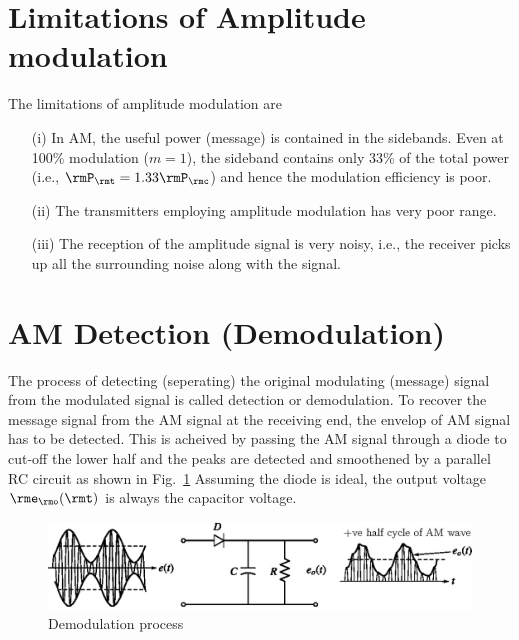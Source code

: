\section{Limitations of Amplitude modulation}\label{sec8.6}
The limitations of amplitude modulation are 
\begin{itemize}
\item[(i)] In AM, the  useful power (message) is contained in the
sidebands. Even at 100\% modulation ($m=1$), the sideband contains
only 33\%  of the total power (i.e., $\rmP_\rmt =1.33 \rmP_\rmc$) and
hence the modulation efficiency is poor.

\item[(ii)] The transmitters employing amplitude modulation has very
poor range.

\item[(iii)] The reception of the amplitude signal is very noisy,
i.e., the receiver picks up all the surrounding noise along with the signal.
\end{itemize}

\section{AM Detection (Demodulation)}\label{sec8.7}
The process of detecting (seperating) the original modulating
(message) signal from the modulated signal is called detection or
demodulation. To recover the message signal from the AM signal at the
receiving end, the envelop of AM signal has to be detected. This is
acheived by passing the AM signal through a diode to cut-off the lower
half and the peaks are detected and smoothened by a parallel RC
circuit as shown in Fig.~\ref{fig8.7} Assuming the diode is ideal, the output
voltage $\rme_\rmo(\rmt)$ is always the capacitor voltage.
\setcounter{figure}{6}
\begin{figure}[H]
\centering
\includegraphics{chap8/fig8.7.eps}
\caption{Demodulation process}\label{fig8.7}
\end{figure}

